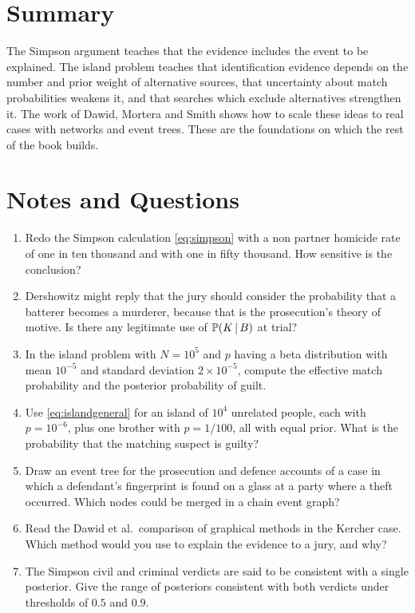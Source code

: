 \section{Summary}

The Simpson argument teaches that the evidence includes the event to be explained. The island problem teaches that identification evidence depends on the number and prior weight of alternative sources, that uncertainty about match probabilities weakens it, and that searches which exclude alternatives strengthen it. The work of Dawid, Mortera and Smith shows how to scale these ideas to real cases with networks and event trees. These are the foundations on which the rest of the book builds.

\section*{Notes and Questions}
\begin{enumerate}[label=\arabic*.]
\item Redo the Simpson calculation \eqref{eq:simpson} with a non partner homicide rate of one in ten thousand and with one in fifty thousand. How sensitive is the conclusion?
\item Dershowitz might reply that the jury should consider the probability that a batterer becomes a murderer, because that is the prosecution's theory of motive. Is there any legitimate use of $\mathbb{P}(K\,\vert\, B)$ at trial?
\item In the island problem with $N = 10^5$ and $p$ having a beta distribution with mean $10^{-5}$ and standard deviation $2\times 10^{-5}$, compute the effective match probability and the posterior probability of guilt.
\item Use \eqref{eq:islandgeneral} for an island of $10^4$ unrelated people, each with $p = 10^{-6}$, plus one brother with $p = 1/100$, all with equal prior. What is the probability that the matching suspect is guilty?
\item Draw an event tree for the prosecution and defence accounts of a case in which a defendant's fingerprint is found on a glass at a party where a theft occurred. Which nodes could be merged in a chain event graph?
\item Read the Dawid et al.\ comparison of graphical methods in the Kercher case. Which method would you use to explain the evidence to a jury, and why?
\item The Simpson civil and criminal verdicts are said to be consistent with a single posterior. Give the range of posteriors consistent with both verdicts under thresholds of $0.5$ and $0.9$.
\end{enumerate}

